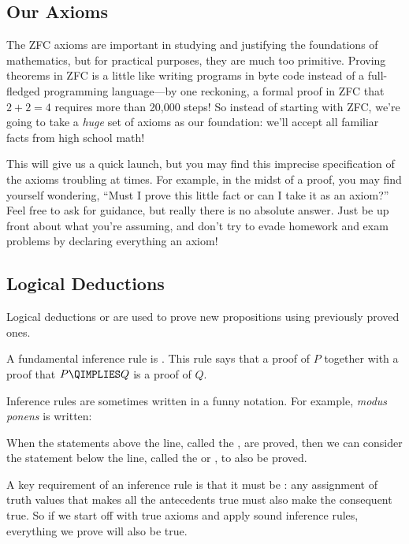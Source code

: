 \subsection{Our Axioms}

The ZFC axioms are important in studying and justifying the foundations of
mathematics, but for practical purposes, they are much too primitive.
Proving theorems in ZFC is a little like writing programs in byte code
instead of a full-fledged programming language---by one reckoning, a
formal proof in ZFC that $2 + 2 = 4$ requires more than 20,000 steps!  So
instead of starting with ZFC, we're going to take a \emph{huge} set of
axioms as our foundation: we'll accept all familiar facts from high school
math!

This will give us a quick launch, but you may find this imprecise
specification of the axioms troubling at times.  For example, in the midst
of a proof, you may find yourself wondering, ``Must I prove this little
fact or can I take it as an axiom?''  Feel free to ask for guidance, but
really there is no absolute answer.  Just be up front about what you're
assuming, and don't try to evade homework and exam problems by declaring
everything an axiom!

\subsection{Logical Deductions}\label{sec:logical_deduction}

Logical deductions or  are used to prove new
propositions using previously proved ones.

A fundamental inference rule is .  This rule says that
a proof of $P$ together with a proof that $P \QIMPLIES Q$ is a proof of
$Q$.

Inference rules are sometimes written in a funny notation.  For example,
\emph{modus ponens} is written:
\begin{rul}\label{rule:modus_ponens}
\end{rul}

When the statements above the line, called the , are
proved, then we can consider the statement below the line, called the
 or , to also be proved.

A key requirement of an inference rule is that it must be : any
assignment of truth values that makes all the antecedents true must also
make the consequent true.  So if we start off with true axioms and apply
sound inference rules, everything we prove will also be true.

